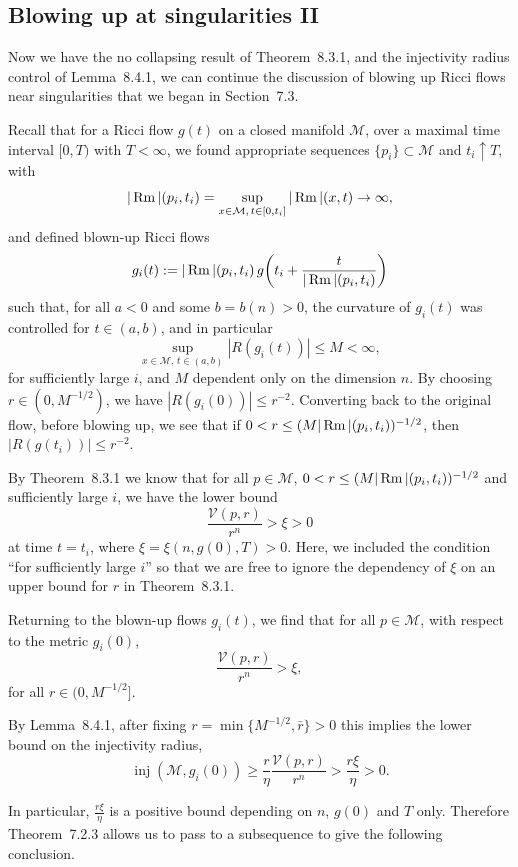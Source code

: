\subsection{Blowing up at singularities II}

Now we have the no collapsing result of Theorem~8.3.1, and the injectivity
radius control of Lemma~8.4.1, we can continue the discussion of blowing up
Ricci flows near singularities that we began in Section~7.3.

Recall that for a Ricci flow $g(t)$ on a closed manifold $\mathcal M$, over a
maximal time interval $[0,T)$ with $T<\infty$, we found appropriate sequences
$\{p_i\}\subset \mathcal M$ and $t_i \uparrow T$, with
\[
|\operatorname{Rm}|(p_i,t_i)=\sup_{x\in \mathcal M,\, t\in [0,t_i]} |\operatorname{Rm}|(x,t) \to \infty,
\]
and defined blown-up Ricci flows
\[
g_i(t):=|\operatorname{Rm}|(p_i,t_i)\, g\!\left(t_i+\frac{t}{|\operatorname{Rm}|(p_i,t_i)}\right)
\]
such that, for all $a<0$ and some $b=b(n)>0$, the curvature of $g_i(t)$ was
controlled for $t\in (a,b)$, and in particular
\[
\sup_{x\in \mathcal M,\, t\in (a,b)} |R(g_i(t))| \le M < \infty,
\]
for sufficiently large $i$, and $M$ dependent only on the dimension $n$. By
choosing $r\in (0,M^{-1/2})$, we have $|R(g_i(0))|\le r^{-2}$. Converting back
to the original flow, before blowing up, we see that if
$0<r\le (M|\operatorname{Rm}|(p_i,t_i))^{-1/2}$, then $|R(g(t_i))|\le r^{-2}$.

By Theorem~8.3.1 we know that for all $p\in \mathcal M$,
$0<r\le (M|\operatorname{Rm}|(p_i,t_i))^{-1/2}$ and sufficiently large $i$, we have the
lower bound
\[
\frac{\mathcal V(p,r)}{r^n}>\xi>0
\]
at time $t=t_i$, where $\xi=\xi(n,g(0),T)>0$. Here, we included the condition
``for sufficiently large $i$'' so that we are free to ignore the dependency of
$\xi$ on an upper bound for $r$ in Theorem~8.3.1.

Returning to the blown-up flows $g_i(t)$, we find that for all $p \in \mathcal M$,
with respect to the metric $g_i(0)$,
\[
\frac{\mathcal V(p,r)}{r^n} > \xi,
\]
for all $r \in (0, M^{-1/2}]$.

By Lemma~8.4.1, after fixing $r = \min\{M^{-1/2}, \bar r\} > 0$ this implies
the lower bound on the injectivity radius,
\[
\operatorname{inj}(\mathcal M,g_i(0)) \ge \frac{r}{\eta}\frac{\mathcal V(p,r)}{r^n} > \frac{r\xi}{\eta} > 0.
\]

In particular, $\frac{r\xi}{\eta}$ is a positive bound depending on $n$,
$g(0)$ and $T$ only. Therefore Theorem~7.2.3 allows us to pass to a subsequence
to give the following conclusion.


